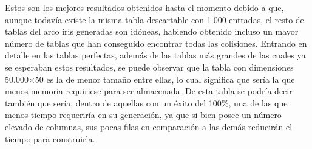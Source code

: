 \documentclass[12pt,spanish,listoffigures,listoftables,listofalgorithms]{tfgetsinf}
\begin{document}
\def\arraystretch{1.5}
\begin{table}[H]
	\LARGE
	\centering
	\caption{Porcentajes de éxito para las tablas empleando la concatenación de las funciones de reconstrucción}
	\label{resR1R2}
\end{table}

Estos son los mejores resultados obtenidos hasta el momento debido a que, aunque todavía existe la misma tabla descartable con 1.000 entradas, el resto de tablas del arco iris generadas son idóneas, habiendo obtenido incluso un mayor número de tablas que han conseguido encontrar todas las colisiones. Entrando en detalle en las tablas perfectas, además de las tablas más grandes de las cuales ya se esperaban estos resultados, se puede observar que la tabla con dimensiones 50.000$\times$50 es la de menor tamaño entre ellas, lo cual significa que sería la que menos memoria requiriese para ser almacenada. De esta tabla se podría decir también que sería, dentro de aquellas con un éxito del 100\%, una de las que menos tiempo requeriría en su generación, ya que si bien posee un número elevado de columnas, sus pocas filas en comparación a las demás reducirán el tiempo para construirla.
\end{document}
